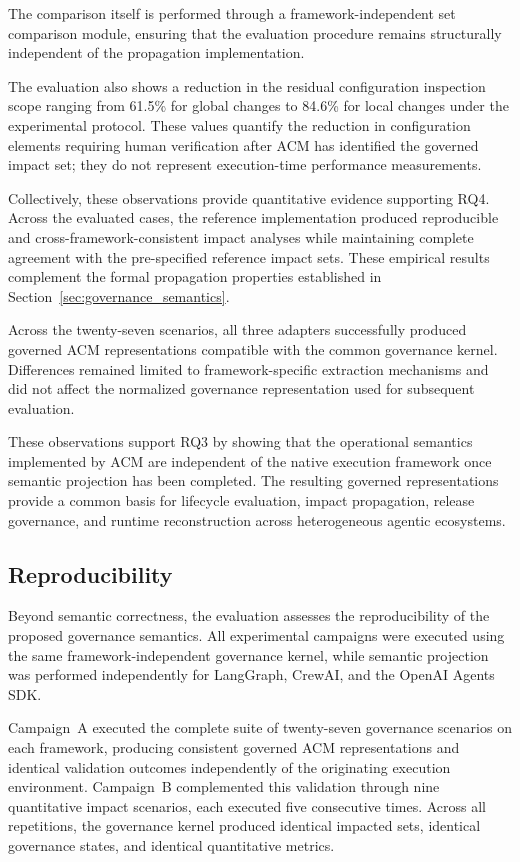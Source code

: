 \documentclass[10pt]{article}
\begin{document}
The comparison itself is performed through a framework-independent set comparison module, ensuring that the evaluation procedure remains structurally independent of the propagation implementation.

The evaluation also shows a reduction in the residual configuration inspection scope ranging from 61.5\% for global changes to 84.6\% for local changes under the experimental protocol. These values quantify the reduction in configuration elements requiring human verification after ACM has identified the governed impact set; they do not represent execution-time performance measurements. 

Collectively, these observations provide quantitative evidence supporting RQ4. Across the evaluated cases, the reference implementation produced reproducible and cross-framework-consistent impact analyses while maintaining complete agreement with the pre-specified reference impact sets. These empirical results complement the formal propagation properties established in Section~\ref{sec:governance_semantics}.

Across the twenty-seven scenarios, all three adapters successfully produced governed ACM representations compatible with the common governance kernel. Differences remained limited to framework-specific extraction mechanisms and did not affect the normalized governance representation used for subsequent evaluation.

These observations support RQ3 by showing that the operational semantics implemented by ACM are independent of the native execution framework once semantic projection has been completed. The resulting governed representations provide a common basis for lifecycle evaluation, impact propagation, release governance, and runtime reconstruction across heterogeneous agentic ecosystems.

\subsection{Reproducibility}
\label{subsec:reproducibility}

Beyond semantic correctness, the evaluation assesses the reproducibility of the proposed governance semantics. All experimental campaigns were executed using the same framework-independent governance kernel, while semantic projection was performed independently for LangGraph, CrewAI, and the OpenAI Agents SDK.

Campaign~A executed the complete suite of twenty-seven governance scenarios on each framework, producing consistent governed ACM representations and identical validation outcomes independently of the originating execution environment. Campaign~B complemented this validation through nine quantitative impact scenarios, each executed five consecutive times. Across all repetitions, the governance kernel produced identical impacted sets, identical governance states, and identical quantitative metrics.
\end{document}
